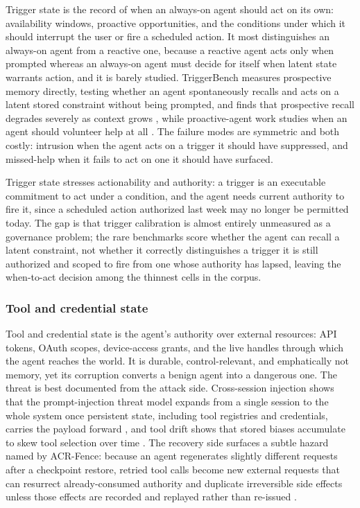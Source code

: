 Trigger state is the record of when an always-on agent should act on its own: availability windows, proactive opportunities, and the conditions under which it should interrupt the user or fire a scheduled action. It most distinguishes an always-on agent from a reactive one, because a reactive agent acts only when prompted whereas an always-on agent must decide for itself when latent state warrants action, and it is barely studied. TriggerBench measures prospective memory directly, testing whether an agent spontaneously recalls and acts on a latent stored constraint without being prompted, and finds that prospective recall degrades severely as context grows \citep{zhang2026triggerbench}, while proactive-agent work studies when an agent should volunteer help at all \citep{lu2024proactiveagent}. The failure modes are symmetric and both costly: intrusion when the agent acts on a trigger it should have suppressed, and missed-help when it fails to act on one it should have surfaced.

Trigger state stresses actionability and authority: a trigger is an executable commitment to act under a condition, and the agent needs current authority to fire it, since a scheduled action authorized last week may no longer be permitted today. The gap is that trigger calibration is almost entirely unmeasured as a governance problem; the rare benchmarks score whether the agent can recall a latent constraint, not whether it correctly distinguishes a trigger it is still authorized and scoped to fire from one whose authority has lapsed, leaving the when-to-act decision among the thinnest cells in the corpus.

\subsubsection{Tool and credential state}

Tool and credential state is the agent's authority over external resources: API tokens, OAuth scopes, device-access grants, and the live handles through which the agent reaches the world. It is durable, control-relevant, and emphatically not memory, yet its corruption converts a benign agent into a dangerous one. The threat is best documented from the attack side. Cross-session injection shows that the prompt-injection threat model expands from a single session to the whole system once persistent state, including tool registries and credentials, carries the payload forward \citep{xie2026crosssessioninjection}, and tool drift shows that stored biases accumulate to skew tool selection over time \citep{dabas2026tooldrift}. The recovery side surfaces a subtle hazard named by ACR-Fence: because an agent regenerates slightly different requests after a checkpoint restore, retried tool calls become new external requests that can resurrect already-consumed authority and duplicate irreversible side effects unless those effects are recorded and replayed rather than re-issued \citep{zheng2026acrfence}.

